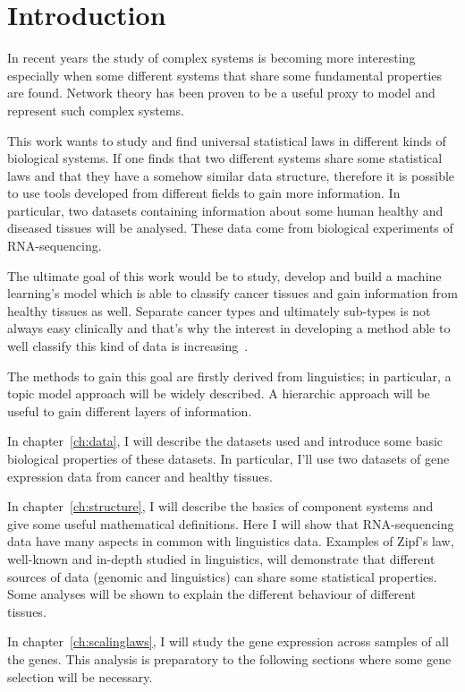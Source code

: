 \chapter{Introduction}\label{ch:intro}
In recent years the study of complex systems is becoming more interesting especially when some different systems that share  some fundamental properties are found. Network theory has been proven to be a useful proxy to model and represent such complex systems.

This work wants to study and find universal statistical laws in different kinds of biological systems. If one finds that two different systems share some statistical laws and that they have a somehow similar data structure, therefore it is possible to use tools developed from different fields to gain more information. In particular, two datasets containing information about some human healthy and diseased tissues will be analysed. These data come from biological experiments of RNA-sequencing.

The ultimate goal of this work would be to study, develop and build a machine learning's model which is able to classify cancer tissues and gain information from healthy tissues as well. Separate cancer types and ultimately sub-types is not always easy clinically and that's why the interest in developing a method able to well classify this kind of data is increasing~\cite{Farver2018}.

The methods to gain this goal are firstly derived from linguistics; in particular, a topic model approach will be widely described. A hierarchic approach will be useful to gain different layers of information.

In chapter~\ref{ch:data}, I will describe the datasets used and introduce some basic biological properties of these datasets. In particular, I'll use two datasets of gene expression data from cancer and healthy tissues.

In chapter~\ref{ch:structure}, I will describe the basics of component systems and give some useful mathematical definitions. Here I will show that RNA-sequencing data have many aspects in common with linguistics data. Examples of Zipf's law, well-known and in-depth studied in linguistics, will demonstrate that different sources of data (genomic and linguistics) can share some statistical properties. Some analyses will be shown to explain the different behaviour of different tissues.

In chapter~\ref{ch:scalinglaws}, I will study the gene expression across samples of all the genes. This analysis is preparatory to the following sections where some gene selection will be necessary.

